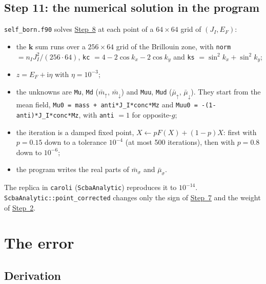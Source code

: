 \documentclass[11pt,a4paper]{article}
\newcommand{\up}{{\uparrow}}
\newcommand{\dn}{{\downarrow}}
\newcommand{\I}{\mathrm{i}}
\begin{document}
\subsection{Step 11: the numerical solution in the program}\label{st:program}

\texttt{self\_born.f90} solves \hyperref[st:equations]{Step~8} at each point of a $64\times64$ grid of
$(J_I,E_F)$:
\begin{itemize}
\item the $\bm k$ sum runs over a $256\times64$ grid of the Brillouin zone, with
  \texttt{norm} $=n_IJ_I^2/(256\cdot64)$, \texttt{kc} $=4-2\cos k_x-2\cos k_y$ and
  \texttt{ks} $=\sin^2k_x+\sin^2k_y$;
\item $z=E_F+\I\eta$ with $\eta=10^{-3}$;
\item the unknowns are \texttt{Mu}, \texttt{Md} ($\bar m_\up$, $\bar m_\dn$) and \texttt{Muu},
  \texttt{Mud} ($\bar\mu_\up$, $\bar\mu_\dn$). They start from the mean field,
  \texttt{Mu0 = mass + anti*J\_I*conc*Mz} and \texttt{Muu0 = -(1-anti)*J\_I*conc*Mz}, with
  \texttt{anti} $=1$ for opposite-$g$;
\item the iteration is a damped fixed point, $X\leftarrow pF(X)+(1-p)X$: first with $p=0.15$
  down to a tolerance $10^{-4}$ (at most 500 iterations), then with $p=0.8$ down to $10^{-6}$;
\item the program writes the real parts of $\bar m_\sigma$ and $\bar\mu_\sigma$.
\end{itemize}
The replica in \texttt{caroli} (\texttt{ScbaAnalytic}) reproduces it to $10^{-14}$.
\texttt{ScbaAnalytic::point\_corrected} changes only the sign of \hyperref[st:identify]{Step~7} and the
weight of \hyperref[st:disorder]{Step~2}.

\section{The error}\label{s:error}

\subsection{Derivation}
\end{document}
